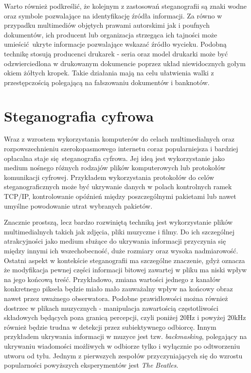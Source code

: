 {{        %
        Warto również podkreślić, że kolejnym z zastosowań steganografii są znaki wodne oraz symbole pozwalające na
        identyfikację źródła informacji. Za równo w przypadku multimediów objętych prawami autorskimi jak i poufnych
        dokumentów, ich producent lub organizacja strzegąca ich tajności może umieścić ukryte informacje pozwalające
        wskazać źródło wycieku\cite{Nasereddin2011DIGITALWA}. Podobną technikę stosują producenci drukarek - seria oraz
        model drukarki może być odzwierciedlona w drukowanym dokumencie poprzez układ niewidocznych gołym okiem żółtych
        kropek. Takie działania mają na celu ułatwienia walki z przestępczością polegającą na fałszowaniu dokumentów i
        banknotów\cite{Richter2018ForensicAA}.
    }

    \section{Steganografia cyfrowa}
    {
        Wraz z wzrostem wykorzystania komputerów do celach multimedialnych oraz rozpowszechnieniu szerokopasmowego
        internetu coraz popularniejsza i bardziej opłacalna staje się steganografia cyfrowa. Jej ideą jest wykorzystanie
        jako medium nośnego różnych rodzajów plików komputerowych lub protokołów komunikacji cyfrowej. Przykładem
        wykorzystania protokołów do celów steganograficznych może być ukrywanie danych w polach kontrolnych ramek
        TCP/IP, kontrolowanie opóźnień między poszczególnymi pakietami lub nawet umyślne powodowanie utrat wybranych
        pakietów\cite{DataHidinginTCP}.

        Znacznie prostszą, lecz bardzo rozwiniętą techniką jest wykorzystanie plików multimedialnych takich jak zdjęcia,
        pliki muzyczne i filmy. Do ich szczególnej atrakcyjności jako medium służące do ukrywania informacji przyczynia
        się między innymi ich wszechobecność, duże rozmiary oraz wysoka nadmiarowość\cite{Mitchell2018H264ED,
        Pope2012DigitalS}. Ostatni aspekt w kontekście steganografii ma szczególne znaczenie, gdyż oznacza że
        modyfikacja pewnej części informacji bitowej zawartej w pliku ma niski wpływ na jego końcową treść. Przykładowo,
        zmiana wartości jednego z kanałów konkretnego piksela będzie miało mało zauważalny wpływ na końcowy obraz nawet
        przez uważnego obserwatora. Podobne prawidłowości można również dostrzec w plikach muzycznych - manipulacja
        zawartością częstotliwości składowych będących poza granicą percepcji, czyli poniżej 20Hz i powyżej 20kHz
        również będzie trudna w detekcji przez subiektywnego odbiorcę\cite{Wheeler2012AudioSU}. Innym przykładem
        ukrywania informacji w muzyce jest tzw. \textit{backmasking}, polegający na ukrywaniu wiadomości możliwych w
        odbiorze tylko i wyłącznie po odtworzeniu utworu od tyłu. Jednym z pierwszych zespołów przyczyniających się do
        wzrostu popularności powyższych eksperymentów jest \textit{The Beatles}.
    }
    
}

